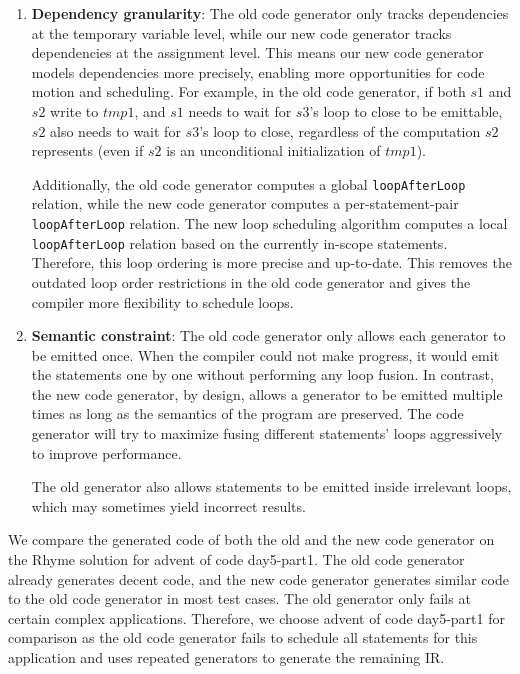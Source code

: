 \documentclass[sigplan, nonacm]{acmart}\settopmatter{printfolios=true,printccs=false,printacmref=false}
\begin{document}
\begin{enumerate}
\item \textbf{Dependency granularity}: The old code generator only tracks dependencies at the temporary variable level, while our new code generator tracks dependencies at the assignment level. This means our new code generator models dependencies more precisely, enabling more opportunities for code motion and scheduling. For example, in the old code generator, if both $s1$ and $s2$ write to $tmp1$, and $s1$ needs to wait for $s3$'s loop to close to be emittable, $s2$ also needs to wait for $s3$'s loop to close, regardless of the computation $s2$ represents (even if $s2$ is an unconditional initialization of $tmp1$).

Additionally, the old code generator computes a global \texttt{loopAfterLoop} relation, while the new code generator computes a per-statement-pair \texttt{loopAfterLoop} relation. The new loop scheduling algorithm computes a local \texttt{loopAfterLoop} relation based on the currently in-scope statements. Therefore, this loop ordering is more precise and up-to-date. This removes the outdated loop order restrictions in the old code generator and gives the compiler more flexibility to schedule loops.

\item \textbf{Semantic constraint}: The old code generator only allows each generator to be emitted once. When the compiler could not make progress, it would emit the statements one by one without performing any loop fusion. In contrast, the new code generator, by design, allows a generator to be emitted multiple times as long as the semantics of the program are preserved. The code generator will try to maximize fusing different statements' loops aggressively to improve performance.

The old generator also allows statements to be emitted inside irrelevant loops, which may sometimes yield incorrect results.
\end{enumerate}
\iffalse
We compare the generated code of both the old and the new code generator on the Rhyme solution for advent of code day5-part1. The old code generator already generates decent code, and the new code generator generates similar code to the old code generator in most test cases. The old generator only fails at certain complex applications. Therefore, we choose advent of code day5-part1 for comparison as the old code generator fails to schedule all statements for this application and uses repeated generators to generate the remaining IR.\par
\end{document}
